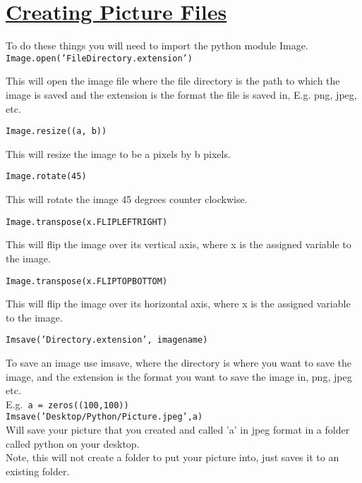 \section*{\underline{Creating Picture Files}}
To do these things you will need to import the python module Image.\\[2ex]
\noindent \texttt{Image.open('FileDirectory.extension')}
\begin{myindentpar}{1.4cm}
\vspace*{-1ex}
This will open the image file where the file directory is the path to which the image is saved and the extension is the format the file is saved in, E.g. png, jpeg, etc.

\end{myindentpar}

\noindent \texttt{Image.resize((a, b))}
\begin{myindentpar}{1.4cm}
\vspace*{-1ex}
This will resize the image to be a pixels by b pixels.
\end{myindentpar}

\noindent \texttt{Image.rotate(45)}
\begin{myindentpar}{1.4cm}
\vspace*{-1ex}
This will rotate the image 45 degrees counter clockwise.
\end{myindentpar}

\noindent \texttt{Image.transpose(x.FLIP\textunderscore LEFT\textunderscore RIGHT)}
\begin{myindentpar}{1.4cm}
\vspace*{-1ex}
This will flip the image over its vertical axis, where x is the assigned variable to the image.
\end{myindentpar}

\noindent \texttt{Image.transpose(x.FLIP\textunderscore TOP\textunderscore BOTTOM)}
\begin{myindentpar}{1.4cm}
\vspace*{-1ex}
This will flip the image over its horizontal axis, where x is the assigned variable to the image.
\end{myindentpar}

\newpage
\noindent \texttt{Imsave('Directory.extension', imagename)}
\begin{myindentpar}{1.4cm}
\vspace*{-1ex}
To save an  image use imsave, where the directory is where you want to save the image, and the extension is the format you want to save the image in, png, jpeg etc.\\
E.g.\texttt{ a = zeros((100,100))}\\
\texttt{Imsave('Desktop/Python/Picture.jpeg',a)}\\
Will save your picture that you created and called 'a' in jpeg format in a folder called python on your desktop.\\
Note, this will not create a folder to put your picture into, just saves it to an existing folder.
\end{myindentpar}

